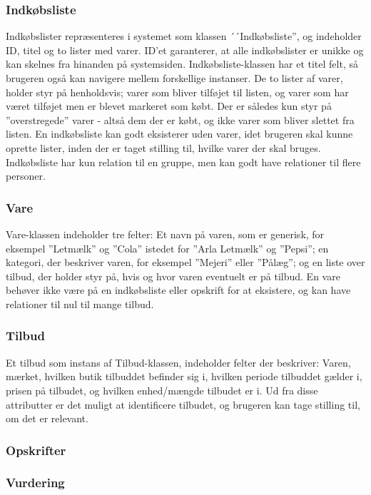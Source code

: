 \subsubsection{Indkøbsliste}
Indkøbslister repræsenteres i systemet som klassen ´´Indkøbsliste'', og indeholder ID, titel og to lister med varer.
ID'et garanterer, at alle indkøbslister er unikke og kan skelnes fra hinanden på systemsiden.
Indkøbsliste-klassen har et titel felt, så brugeren også kan navigere mellem forskellige instanser.
De to lister af varer, holder styr på henholdsvis; varer som bliver tilføjet til listen, og varer som har været tilføjet men er blevet markeret som købt.
Der er således kun styr på ''overstregede'' varer - altså dem der er købt, og ikke varer som bliver slettet fra listen.
En indkøbsliste kan godt eksisterer uden varer, idet brugeren skal kunne oprette lister, inden der er taget stilling til, hvilke varer der skal bruges.
Indkøbsliste har kun relation til en gruppe, men kan godt have relationer til flere personer.

\subsubsection{Vare}
Vare-klassen indeholder tre felter: Et navn på varen, som er generisk, for eksempel ''Letmælk'' og ''Cola'' istedet for ''Arla Letmælk'' og ''Pepsi''; en kategori, der beskriver varen, for eksempel ''Mejeri'' eller ''Pålæg''; og en liste over tilbud, der holder styr på, hvis og hvor varen eventuelt er på tilbud.
En vare behøver ikke være på en indkøbsliste eller opskrift for at eksistere, og kan have relationer til nul til mange tilbud.

\subsubsection{Tilbud}
Et tilbud som instans af Tilbud-klassen, indeholder felter der beskriver: Varen, mærket, hvilken butik tilbuddet befinder sig i, hvilken periode tilbuddet gælder i, prisen på tilbudet, og hvilken enhed/mængde tilbudet er i.
Ud fra disse attributter er det muligt at identificere tilbudet, og brugeren kan tage stilling til, om det er relevant.


\subsubsection{Opskrifter}
\lipsum[1]

\subsubsection{Vurdering}
\lipsum[1]
